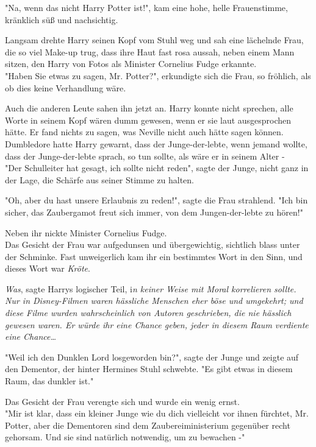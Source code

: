 {"Na, wenn das nicht Harry Potter ist!", kam eine hohe, helle Frauenstimme, kränklich süß und nachsichtig.

Langsam drehte Harry seinen Kopf vom Stuhl weg und sah eine lächelnde Frau, die so viel Make-up trug, dass ihre Haut fast rosa aussah, neben einem Mann sitzen, den Harry von Fotos als Minister Cornelius Fudge erkannte.\\ "Haben Sie etwas zu sagen, Mr. Potter?", erkundigte sich die Frau, so fröhlich, als ob dies keine Verhandlung wäre.

Auch die anderen Leute sahen ihn jetzt an. Harry konnte nicht sprechen, alle Worte in seinem Kopf wären dumm gewesen, wenn er sie laut ausgesprochen hätte. Er fand nichts zu sagen, was Neville nicht auch hätte sagen können. Dumbledore hatte Harry gewarnt, dass der Junge-der-lebte, wenn jemand wollte, dass der Junge-der-lebte sprach, so tun sollte, als wäre er in seinem Alter -\\ "Der Schulleiter hat gesagt, ich sollte nicht reden", sagte der Junge, nicht ganz in der Lage, die Schärfe aus seiner Stimme zu halten.

"Oh, aber du hast unsere Erlaubnis zu reden!", sagte die Frau strahlend. "Ich bin sicher, das Zaubergamot freut sich immer, von dem Jungen-der-lebte zu hören!"

Neben ihr nickte Minister Cornelius Fudge.\\ Das Gesicht der Frau war aufgedunsen und übergewichtig, sichtlich blass unter der Schminke. Fast unweigerlich kam ihr ein bestimmtes Wort in den Sinn, und dieses Wort war \emph{Kröte}.

\emph{Was}, sagte Harrys logischer Teil, i\emph{n keiner Weise mit Moral korrelieren sollte. Nur in Disney-Filmen waren hässliche Menschen eher böse und umgekehrt; und diese Filme wurden wahrscheinlich von Autoren geschrieben, die nie hässlich gewesen waren. Er würde ihr eine Chance geben, jeder in diesem Raum verdiente eine Chance…}

"Weil ich den Dunklen Lord losgeworden bin?", sagte der Junge und zeigte auf den Dementor, der hinter Hermines Stuhl schwebte. "Es gibt etwas in diesem Raum, das dunkler ist."

Das Gesicht der Frau verengte sich und wurde ein wenig ernst.\\ "Mir ist klar, dass ein kleiner Junge wie du dich vielleicht vor ihnen fürchtet, Mr. Potter, aber die Dementoren sind dem Zaubereiministerium gegenüber recht gehorsam. Und sie sind natürlich notwendig, um zu bewachen -"

}
